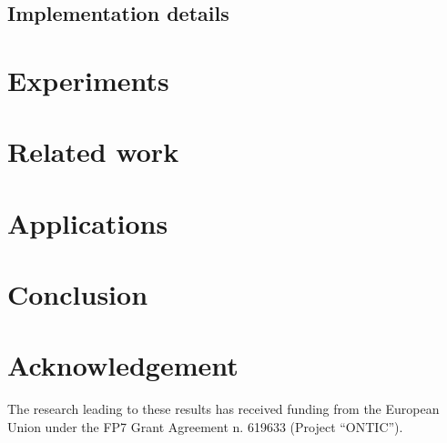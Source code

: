 \documentclass[preprint,review,12pt]{elsarticle}
\begin{document}
\subsection{Implementation details}
\label{MapReduce Carpenter}

%
%


\section{Experiments}
\label{Experiments}




\section{Related work}
\label{Related work}



\section{Applications}
\label{Applications}



\section{Conclusion} \label{Conclusion}


\section*{Acknowledgement}
The research leading to these results has received funding from the European
Union under the FP7 Grant Agreement n. 619633 (Project ``ONTIC'').
\\





{}

\end{document}

